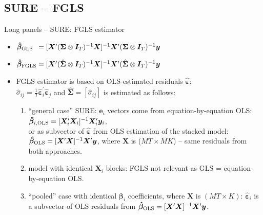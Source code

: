 \documentclass[usenames,dvipsnames]{beamer}
\begin{document}
\subsection*{SURE -- FGLS}
\begin{frame}{Long panels -- SURE: FGLS estimator}
\footnotesize
\begin{itemize}
    \item $\bm{\hat{\beta}}_{\textnormal{GLS}} ~\,= [\bm{X}^{\prime} (\bm{\Sigma} \otimes \bm{I}_T)^{-1} \bm{X}]^{-1} \bm{X}^{\prime} (\bm{\Sigma} \otimes \bm{I}_T)^{-1} \bm{y}$ \\ \smallskip
        \item $\bm{\hat{\beta}}_{\textnormal{FGLS}} = [\bm{X}^{\prime} (\hat{\bm{\Sigma}} \otimes \bm{I}_T)^{-1} \bm{X}]^{-1} \bm{X}^{\prime} (\hat{\bm{\Sigma}} \otimes \bm{I}_T)^{-1} \bm{y}$\\ \bigskip
    \item FGLS estimator is based on OLS-estimated residuals $\bm{\hat{\varepsilon}}$:\\ \bigskip
    $\hat{\sigma}_{ij} = \frac{1}{T}\bm{\hat{\varepsilon}}_i^{\prime}\bm{\hat{\varepsilon}}_j$ \quad and \quad $\hat{\bm{\Sigma}}=[\hat{\sigma}_{ij}]$ is estimated as follows: \medskip
    \begin{enumerate}
    \item ``general case'' SURE:  $\bm{e}_i$ vectors come from equation-by-equation OLS: 
        $\bm{\hat{\beta}}_{i,\textnormal{OLS}} = [\bm{X}_i^{\prime}\bm{X}_i]^{-1} \bm{X}_i^{\prime} \bm{y}_i$,\\ or as subvector of $\bm{\hat{\varepsilon}}$ from OLS estimation of the stacked model: $\bm{\hat{\beta}}_{\textnormal{OLS}} = [\bm{X}^{\prime}\bm{X}]^{-1} \bm{X}^{\prime} \bm{y}$, where $\bm{X}$ is ($MT \times MK$) -- same residuals from both approaches.
       \medskip 
        \item model with identical $\bm{X}_i$ blocks: FGLS not relevant as GLS = equation-by-equation OLS. \\ 
        \medskip
        \item ``pooled'' case with identical $\bm{\beta}_i$ coefficients, where $\bm{X}$ is $(MT\times K)$:
        $\bm{\hat{\varepsilon}}_i$ is a subvector of OLS residuals from 
        $\bm{\hat{\beta}}_{\textnormal{OLS}} = [\bm{X}^{\prime}\bm{X}]^{-1} \bm{X}^{\prime} \bm{y}$.\\ \medskip
         \medskip
        \medskip
    \end{enumerate}

\end{itemize}
\end{frame}
\end{document}
